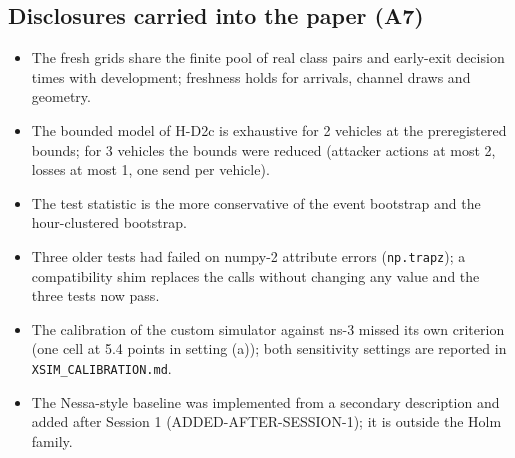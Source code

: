 \subsection*{Disclosures carried into the paper (A7)}

\begin{itemize}
\item The fresh grids share the finite pool of real class pairs and early-exit decision times with development; freshness holds for arrivals, channel draws and geometry.
\item The bounded model of H-D2c is exhaustive for 2 vehicles at the preregistered bounds; for 3 vehicles the bounds were reduced (attacker actions at most 2, losses at most 1, one send per vehicle).
\item The test statistic is the more conservative of the event bootstrap and the hour-clustered bootstrap.
\item Three older tests had failed on numpy-2 attribute errors (\texttt{np.trapz}); a compatibility shim replaces the calls without changing any value and the three tests now pass.
\item The calibration of the custom simulator against ns-3 missed its own criterion (one cell at 5.4 points in setting (a)); both sensitivity settings are reported in \texttt{XSIM\_CALIBRATION.md}.
\item The Nessa-style baseline was implemented from a secondary description and added after Session 1 (ADDED-AFTER-SESSION-1); it is outside the Holm family.
\end{itemize}

